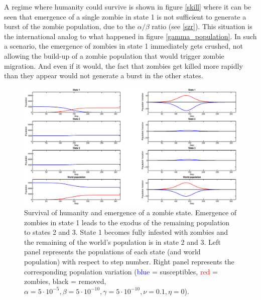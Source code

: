 \documentclass[11pt]{article} %
\begin{document}
A regime where humanity could survive is shown in figure \ref{skill} where it can be seen that emergence of a single zombie in state 1 is not sufficient to generate a burst of the zombie population, due to the $\alpha/\beta$ ratio (see \ref{szr}). This situation is the international analog to what happened in figure \ref{gamma_population}. In such a scenario, the emergence of zombies in state 1 immediately gets crushed, not allowing the build-up of a zombie population that would trigger zombie migration. And even if it would, the fact that zombies get killed more rapidly than they appear would not generate a burst in the other states.




\begin{figure}[h!]
\centerline{
\includegraphics[scale=0.35]{../images/Matlab_figures/example_exode.eps}}
\caption{Survival of humanity and emergence of a zombie state. Emergence of zombies in state 1 leads to the exodus of the remaining population to states 2 and 3. State 1 becomes fully infested with zombies and the remaining of the world's population is in state 2 and 3. Left panel represents the populations of each state (and world population) with respect to step number. Right panel represents the corresponding population variation (\textcolor{blue}{blue} = susceptibles, \textcolor{red}{red} = zombies, black = removed, $\alpha=5\cdot10^{-5},  \beta=5\cdot10^{-10},  \gamma=5\cdot10^{-10},  \nu=0.1,  \eta=0$). \label{exodus} }
\end{figure}
\end{document}
